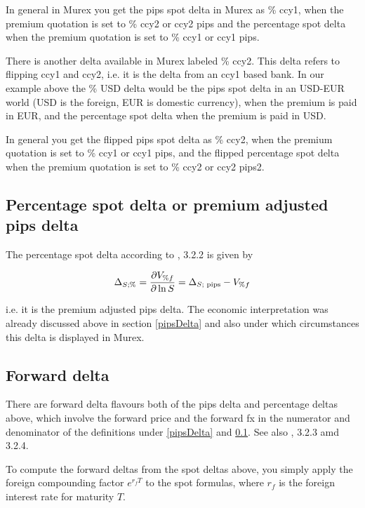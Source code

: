 \documentclass{amsart}
\theoremstyle{plain}
\numberwithin{equation}{section}
\begin{document}
In general in Murex you get the pips spot delta in Murex as \% ccy1, when the premium quotation is set
to \% ccy2 or ccy2 pips and the percentage spot delta when the premium quotation is set to \% ccy1
or ccy1 pips.

There is another delta available in Murex labeled \% ccy2. This delta refers to flipping ccy1 and ccy2,
i.e. it is the delta from an ccy1 based bank. In our example above the \% USD delta would be the pips
spot delta in an USD-EUR world (USD is the foreign, EUR is domestic currency), when the premium is paid
in EUR, and the percentage spot delta when the premium is paid in USD.

In general you get the flipped pips spot delta as \% ccy2, when the premium quotation is set to \% ccy1
or ccy1 pips, and the flipped percentage spot delta when the premium quotation is set to \% ccy2 or
ccy2 pips2.


\subsection{Percentage spot delta or premium adjusted pips delta}
\label{percDelta}

The percentage spot delta according to \cite{Clark}, 3.2.2 is given by

\begin{equation}
\Delta_{S; \%} = \frac{\partial V_{\%f}}{\partial \ln S} = \Delta_{S\textnormal{; pips}} - V_{\% f}
\end{equation}

i.e. it is the premium adjusted pips delta. The economic interpretation was already discussed above
in section \ref{pipsDelta} and also under which circumstances this delta is displayed in Murex.

\subsection{Forward delta}
\label{forwardDelta}

There are forward delta flavours both of the pips delta and percentage deltas above, which involve
the forward price and the forward fx in the numerator and denominator of the definitions under
\ref{pipsDelta} and \ref{percDelta}. See also \cite{Clark}, 3.2.3 amd 3.2.4.

To compute the forward deltas from the spot deltas above, you simply apply the foreign compounding
factor $e^{r_fT}$ to the spot formulas, where $r_f$ is the foreign interest rate for maturity $T$.
\end{document}
